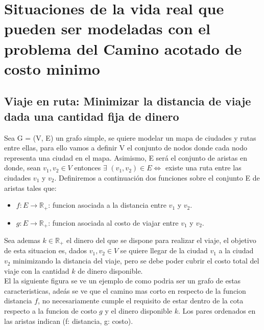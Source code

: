\section{Situaciones de la vida real que pueden ser modeladas con el problema del Camino acotado de costo minimo}
\subsection{Viaje en ruta: Minimizar la distancia de viaje dada una cantidad fija de dinero}
Sea G = (V, E) un grafo simple, se quiere modelar un mapa de ciudades y rutas entre ellas, para ello vamos a definir V el conjunto de nodos donde cada nodo representa una ciudad en el mapa. Asimismo, E ser\'a el conjunto de aristas en donde, sean $v_1,v_2 \in V $ entonces $\exists $ $(v_1,v_2) \in E \Leftrightarrow$ existe una ruta entre las ciudades $v_1$ y $v_2$. Definiremos a continuaci\'on dos funciones sobre el conjunto E de aristas tales que:
\begin{itemize}
	\item $f:E \rightarrow \mathbb{R}_+$: funcion asociada a la distancia entre $v_1$ y $v_2$.
	\item $g:E \rightarrow \mathbb{R}_+$: funcion asociada al costo de viajar entre $v_1$ y $v_2$.
\end{itemize}
Sea ademas $k \in \mathbb{R}_+$ el dinero del que se dispone para realizar el viaje, el objetivo de esta situacion es, dados $v_1, v_2 \in V$ se quiere llegar de la ciudad $v_1$ a la ciudad $v_2$ minimizando la distancia del viaje, pero se debe poder cubrir el costo total del viaje con la cantidad $k$ de dinero disponible.\\
El la siguiente figura se ve un ejemplo de como podria ser un grafo de estas caracteristicas, ade\'as se ve que el camino mas corto en respecto de la funcion distancia $f$, no necesariamente
cumple el requisito de estar dentro de la cota respecto a la funcion de costo $g$ y el dinero disponible $k$. Los pares ordenados en las aristas indican (f: distancia, g: costo).\\

